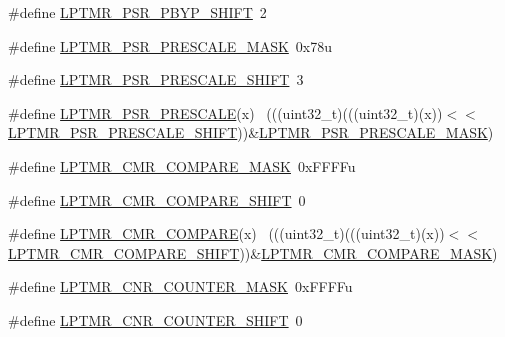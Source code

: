 \begin{DoxyCompactItemize}
\#define \hyperlink{group___l_p_t_m_r___register___masks_ga4bb5021e396db697f5e597fdcdc222e3}{L\+P\+T\+M\+R\+\_\+\+P\+S\+R\+\_\+\+P\+B\+Y\+P\+\_\+\+S\+H\+I\+FT}~2
\item 
\#define \hyperlink{group___l_p_t_m_r___register___masks_ga93a6fe3fb169a73716a837cedb92dbef}{L\+P\+T\+M\+R\+\_\+\+P\+S\+R\+\_\+\+P\+R\+E\+S\+C\+A\+L\+E\+\_\+\+M\+A\+SK}~0x78u
\item 
\#define \hyperlink{group___l_p_t_m_r___register___masks_ga7ed76902e13634d0c543ade3ef47525a}{L\+P\+T\+M\+R\+\_\+\+P\+S\+R\+\_\+\+P\+R\+E\+S\+C\+A\+L\+E\+\_\+\+S\+H\+I\+FT}~3
\item 
\#define \hyperlink{group___l_p_t_m_r___register___masks_gaeb71c6e1dd5200d74099db29087a59e3}{L\+P\+T\+M\+R\+\_\+\+P\+S\+R\+\_\+\+P\+R\+E\+S\+C\+A\+LE}(x)                                    ~(((uint32\+\_\+t)(((uint32\+\_\+t)(x))$<$$<$\hyperlink{group___l_p_t_m_r___register___masks_ga7ed76902e13634d0c543ade3ef47525a}{L\+P\+T\+M\+R\+\_\+\+P\+S\+R\+\_\+\+P\+R\+E\+S\+C\+A\+L\+E\+\_\+\+S\+H\+I\+FT}))\&\hyperlink{group___l_p_t_m_r___register___masks_ga93a6fe3fb169a73716a837cedb92dbef}{L\+P\+T\+M\+R\+\_\+\+P\+S\+R\+\_\+\+P\+R\+E\+S\+C\+A\+L\+E\+\_\+\+M\+A\+SK})
\item 
\#define \hyperlink{group___l_p_t_m_r___register___masks_ga55cc95c022500b353f1724f2cbfe7a8f}{L\+P\+T\+M\+R\+\_\+\+C\+M\+R\+\_\+\+C\+O\+M\+P\+A\+R\+E\+\_\+\+M\+A\+SK}~0x\+F\+F\+F\+Fu
\item 
\#define \hyperlink{group___l_p_t_m_r___register___masks_gae1a525e22dc8b9c6960ae2e859a64232}{L\+P\+T\+M\+R\+\_\+\+C\+M\+R\+\_\+\+C\+O\+M\+P\+A\+R\+E\+\_\+\+S\+H\+I\+FT}~0
\item 
\#define \hyperlink{group___l_p_t_m_r___register___masks_gae5d4cd399ca7bee0964efa18b131a7a9}{L\+P\+T\+M\+R\+\_\+\+C\+M\+R\+\_\+\+C\+O\+M\+P\+A\+RE}(x)                                      ~(((uint32\+\_\+t)(((uint32\+\_\+t)(x))$<$$<$\hyperlink{group___l_p_t_m_r___register___masks_gae1a525e22dc8b9c6960ae2e859a64232}{L\+P\+T\+M\+R\+\_\+\+C\+M\+R\+\_\+\+C\+O\+M\+P\+A\+R\+E\+\_\+\+S\+H\+I\+FT}))\&\hyperlink{group___l_p_t_m_r___register___masks_ga55cc95c022500b353f1724f2cbfe7a8f}{L\+P\+T\+M\+R\+\_\+\+C\+M\+R\+\_\+\+C\+O\+M\+P\+A\+R\+E\+\_\+\+M\+A\+SK})
\item 
\#define \hyperlink{group___l_p_t_m_r___register___masks_ga134708aff0fe3bd31d703e32966c08fc}{L\+P\+T\+M\+R\+\_\+\+C\+N\+R\+\_\+\+C\+O\+U\+N\+T\+E\+R\+\_\+\+M\+A\+SK}~0x\+F\+F\+F\+Fu
\item 
\#define \hyperlink{group___l_p_t_m_r___register___masks_ga3769a974a3d95250e32bb154fa134c3f}{L\+P\+T\+M\+R\+\_\+\+C\+N\+R\+\_\+\+C\+O\+U\+N\+T\+E\+R\+\_\+\+S\+H\+I\+FT}~0

\end{DoxyCompactItemize}
